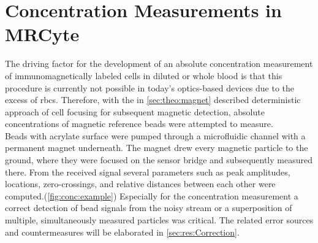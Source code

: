 \section{Concentration Measurements in MRCyte}
\label{sec:res:ConcMeas}
The driving factor for the development of an absolute concentration measurement of immunomagnetically labeled cells in diluted or whole blood is that this procedure is currently not possible in today's optics-based devices due to the excess of \glspl{rbc}.\cite{lit:bio:Alberts} Therefore, with the in \cref{sec:theo:magnet} described deterministic approach of cell focusing for subsequent magnetic detection, absolute concentrations of magnetic reference beads were attempted to measure.\\
Beads with acrylate surface were pumped through a microfluidic channel with a permanent magnet underneath. The magnet drew every magnetic particle to the ground, where they were focused on the sensor bridge and subsequently measured there. From the received signal several parameters such as peak amplitudes, locations, zero-crossings, and relative distances between each other were computed.(\cref{fig:conc:example}) Especially for the concentration measurement a correct detection of bead signals from the noisy stream or a superposition of multiple, simultaneously measured particles was critical. The related error sources and countermeasures will be elaborated in \cref{sec:res:Correction}.


